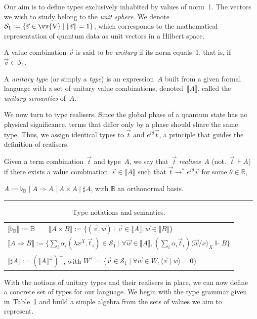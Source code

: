 \documentclass[a4paper,UKenglish,numberwithinsect,pdfa,anonymous]{lipics-v2021}
\theoremstyle{restatestyle}
\newcommand\s[1]{\ensuremath{\mathsf{#1}}}
\newcommand\Val{{\s V}}
\newcommand\lra{\longrightarrow}
\newcommand\ansubst[2]{\ensuremath{\langle #1 \rangle_{#2}}}
\def\R{\mathbb{R}}            %
\def\Val{\mathrm{V}}          %
\def\Sph{\mathcal{S}_1}       %
\def\scal#1#2{\langle{#1}~|~{#2}\rangle}
\def\Lam#1#2#3{\lambda#1^{#2}{.}#3} %
\def\eval{\lra^*}
\def\BB{\mathbb{B}}
\def\Arr{\Rightarrow}
\def\sem#1{\llbracket#1\rrbracket}
\def\real{\Vdash}
\newcommand\basis[1]{\ensuremath{\flat_{#1}}}
\begin{document}
Our aim is to define types exclusively inhabited by values of norm~1. The
vectors we wish to study belong to the \emph{unit sphere}. We denote $\Sph 
:= \{\vec v \in \vv{\Val} \mid \|\vec v\| = 1\}$, which
corresponds to the mathematical representation of quantum data as unit vectors
in a Hilbert space.

\begin{definition}
  A value combination $\vec{v}$ is said to be \emph{unitary} if its norm equals~1,
  that is, if $\vec{v}\in\Sph$.
\end{definition}

\begin{definition}
  A \emph{unitary type} (or simply a \emph{type}) is an expression~$A$ built from
  a given formal language with a set of unitary value combinations, denoted~$\sem{A}$,
  called the \emph{unitary semantics} of~$A$.
\end{definition}


We now turn to type realisers.  
Since the global phase of a quantum state has no physical significance, terms
that differ only by a phase should share the same type.  
Thus, we assign identical types to $\vec t$ and $e^{i\theta}\vec t$, a principle
that guides the definition of realisers.

\begin{definition}\label{def:realiser}
  Given a term combination~$\vec t$ and type~$A$, we say that~$\vec t$
  \emph{realises}~$A$ (not.~$\vec t \real A$) if there exists a value
  combination~$\vec v\in\sem A$ such that
  $\vec{t}\eval e^{i\theta}\vec{v}$ for some $\theta\in\R$,
\end{definition}

\begin{table}[t]
  \centering
  $A := \basis{\BB} \mid A\Arr A \mid A\times A \mid \sharp A$, with $\BB$ an orthonormal basis.
  \vspace{2pt}
  \hrule
  \vspace{4pt}
  \begin{tabular}{l}
    $\sem{\basis{\BB}}:= \BB \qquad \sem{A\times B}:= \{(\vec v, \vec w) \mid \vec v\in\sem{A}, \vec w\in\sem{B}\}$ \\
    $\sem{A\Arr B}:= \{\sum_i \alpha_i(\Lam{x}{X}{\vec{t}_{i}})\in\Sph \mid \forall\vec{w}\in\sem{A}, (\sum_i \alpha_i \vec{t}_{i})\ansubst{\vec{w}/x}{X}\real B\}$ \\
    $\sem{\sharp A}:= {(\sem{A}^\bot)}^\bot$, with $W^\bot = \{\vec{v}\in\Sph \mid \forall \vec{w}\in W, \scal{\vec{v}}{\vec{w}} = 0\}$
  \end{tabular}
  \caption{Type notations and semantics.}
  \label{tab:UnitaryTypes}
\end{table}
With the notions of unitary types and their realisers in place, we can now
define a concrete set of types for our language. We begin with the type grammar
given in~Table~\ref{tab:UnitaryTypes} and build a simple algebra from the sets of
values we aim to represent.
\end{document}
